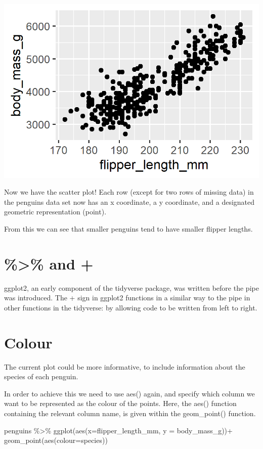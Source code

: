 \documentclass[
]{book}
\newenvironment{Shaded}{\begin{snugshade}}{\end{snugshade}}
\newcommand{\AttributeTok}[1]{\textcolor[rgb]{0.77,0.63,0.00}{#1}}
\newcommand{\FunctionTok}[1]{\textcolor[rgb]{0.00,0.00,0.00}{#1}}
\newcommand{\NormalTok}[1]{#1}
\newcommand{\SpecialCharTok}[1]{\textcolor[rgb]{0.00,0.00,0.00}{#1}}
\begin{document}
\includegraphics[width=0.8\linewidth]{images/simplepoints}

Now we have the scatter plot! Each row (except for two rows of missing data) in the penguins data set now has an x coordinate, a y coordinate, and a designated geometric representation (point).

From this we can see that smaller penguins tend to have smaller flipper lengths.

\hypertarget{and}{%
\section{\%\textgreater\% and +}\label{and}}

ggplot2, an early component of the tidyverse package, was written before the pipe was introduced. The + sign in ggplot2 functions in a similar way to the pipe in other functions in the tidyverse: by allowing code to be written from left to right.

\hypertarget{colour}{%
\section{Colour}\label{colour}}

The current plot could be more informative, to include information about the species of each penguin.

In order to achieve this we need to use aes() again, and specify which column we want to be represented as the colour of the points.
Here, the aes() function containing the relevant column name, is given within the geom\_point() function.

\begin{Shaded}
\begin{Highlighting}[]
\NormalTok{penguins }\SpecialCharTok{\%\textgreater{}\%} 
  \FunctionTok{ggplot}\NormalTok{(}\FunctionTok{aes}\NormalTok{(}\AttributeTok{x=}\NormalTok{flipper\_length\_mm, }
             \AttributeTok{y =}\NormalTok{ body\_mass\_g))}\SpecialCharTok{+}
  \FunctionTok{geom\_point}\NormalTok{(}\FunctionTok{aes}\NormalTok{(}\AttributeTok{colour=}\NormalTok{species))}
\end{Highlighting}
\end{Shaded}
\end{document}
